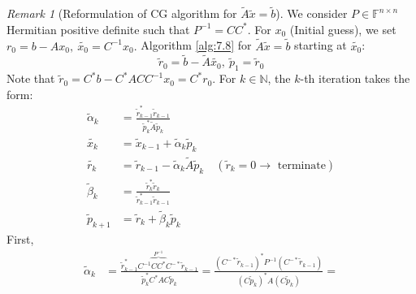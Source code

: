\documentclass[12pt]{article}
\theoremstyle{definition}
\theoremstyle{remark}
\newtheorem*{remark*}{Remark}
\numberwithin{equation}{section}
\newcommand{\F}{\mathbb{F}}
\newcommand{\N}{\mathbb{N}}
\begin{document}
\begin{remark*}[Reformulation of CG algorithm for $\tilde{A} \tilde{x} = \tilde{b}$]
  We consider $P \in \F^{n\times n}$ Hermitian positive definite such that $P^{-1} = CC^*$. For $x_0$ (Initial guess), we set $r_0 = b-Ax_0,\ \tilde{x_0} = C^{-1} x_0.$ Algorithm \ref{alg:7.8} for $\tilde{A} \tilde{x} = \tilde{b}$ starting at $\tilde{x_0}$:
  \begin{equation*}
    \tilde{r}_0 = \tilde{b} - \tilde{A} \tilde{x_0},\ \tilde{p}_1 = \tilde{r}_0
  \end{equation*}
  Note that $\tilde{r}_0 = C^*b - C^*A C C^{-1} x_0 = C^* r_0$. For $k \in \N$, the $k$-th iteration takes the form:
  \begin{align*}
    \tilde{\alpha}_k &= \frac{\tilde{r}_{k-1}^* \tilde{r}_{k-1}}{\tilde{p}_k^* \tilde{A} \tilde{p}_k}\\
    \tilde{x_k} &= \tilde{x}_{k-1} + \tilde{\alpha}_k \tilde{p}_k\\
    \tilde{r_k} &= \tilde{r}_{k-1} - \tilde{\alpha}_k \tilde{A} \tilde{p}_k \quad (\tilde{r}_k = 0 \rightarrow \text{ terminate})\\
    \tilde{\beta}_k &= \frac{\tilde{r}_k^* \tilde{r}_k}{\tilde{r}_{k-1}^* \tilde{r}_{k-1}}\\
    \tilde{p}_{k+1} &= \tilde{r}_k + \tilde{\beta}_k \tilde{p}_k
  \end{align*}
  First,
  \begin{align*}
    \tilde{\alpha}_k &= \frac{\tilde{r}_{k-1}^* C^{-1} \overbrace{C C^*}^{P^{-1}} C^{-*} \tilde{r}_{k-1}}{\tilde{p}_k^* C^* A C \tilde{p}_k} = \frac{(C^{-*}\tilde{r}_{k-1})^*P^{-1}(C^{-*}\tilde{r}_{k-1})}{(C \tilde{p}_k)^* A (C \tilde{p}_k)} =
  \end{align*}
\end{remark*}
\end{document}
